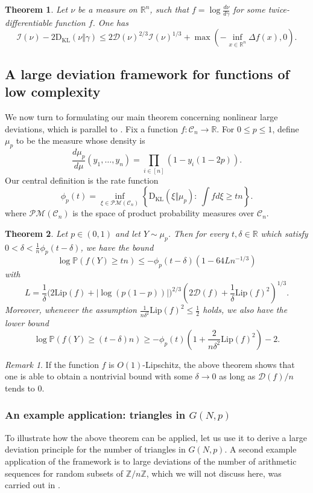 \documentclass[12pt]{article}
\def \I{\mathcal{I}}
\def \RR {\mathbb R}
\def \PP {\mathbb P}
\def \Lip {\mathrm {Lip}}
\def \DC {\mathcal{C}_n}
\def \KL {\mathrm{D}_{\mathrm{KL}}}
\def \Comp { \mathcal{D} }
\newtheorem{theorem}{Theorem}
\theoremstyle{definition}
\theoremstyle{remark}
\newtheorem{remark}{Remark}
\begin{document}
\begin{theorem}\label{thm:mainGaussian}
Let $\nu$ be a measure on $\RR^n$, such that $f = \log \frac{d \nu}{d \gamma}$ for some twice-differentiable function $f$. One has
$$
\I(\nu) - 2 \KL(\nu \Vert \gamma) \leq 2 \Comp(\nu)^{2/3} \I(\nu)^{1/3} + \max \left (- \inf_{x \in \RR^n} \Delta f(x), 0 \right).
$$
\end{theorem}

\subsection{A large deviation framework for functions of low complexity}
We now turn to formulating our main theorem concerning nonlinear large deviations, which is parallel to \cite[Theorem 1.1]{CD14}. Fix a function $f: \DC \to \RR$. For $0\leq p \leq 1$, define $\mu_p$ to be the measure whose density is
$$
\frac{d \mu_p}{d \mu} (y_1,\dots,y_n) = \prod_{i \in [n]} \left (1 - y_i (1- 2 p) \right ).
$$
Our central definition is the rate function
\begin{equation}\label{eq:defphi}
\phi_p(t) = \inf_{\xi \in \mathcal{PM}(\DC)} \left \{  \KL( \xi \Vert \mu_p) : ~ \int f d \xi \geq t n  \right \}.
\end{equation}
where $\mathcal{PM}(\DC)$ is the space of product probability measures over $\DC$.
\begin{theorem}\label{thm:largedev}
Let $p \in (0,1)$ and let $Y \sim \mu_p$. Then for every $t,\delta \in \RR$ which satisfy $0 < \delta < \tfrac{1}{n} \phi_p(t-\delta)$, we have the bound
$$
\log \PP(f(Y) \geq tn) \leq - \phi_p(t-\delta) \left (1 - 64 L n^{-1/3} \right )
$$
with
{ \small
$$
L = \frac{1}{\delta} \bigl ( 2 \Lip(f) + |\log(p(1-p))| \bigr )^{2/3} \left ( 2 \Comp(f) + \frac{1}{\delta} \Lip(f)^2 \right )^{1/3}.
$$ }
Moreover, whenever the assumption $\frac{1}{n \delta^2 } \Lip(f)^2 \leq \tfrac{1}{2}$ holds, we also have the lower bound
$$
\log \PP(f(Y) \geq (t - \delta) n) \geq -\phi_p(t) \left ( 1 + \frac{2}{n \delta^2 } \Lip(f)^2 \right ) - 2.
$$
\end{theorem}

\begin{remark}
If the function $f$ is $O(1)$-Lipschitz, the above theorem shows that one is able to obtain a nontrivial bound with some $\delta \to 0$ as long as $\Comp(f)/n$ tends to $0$.
\end{remark}

\subsubsection{An example application: triangles in $G(N,p)$} \label{sec:triangles}
To illustrate how the above theorem can be applied, let us use it to derive a large deviation principle for the number of triangles in $G(N,p)$. A second example application of the framework is to large deviations of the number of arithmetic sequences for random subsets of $\mathbb{Z} / n \mathbb{Z}$, which we will not discuss here, was carried out in \cite{BBGSZ16}. 
\end{document}
